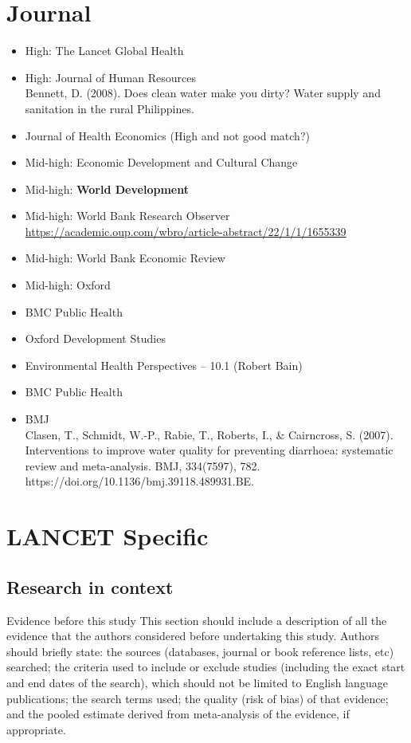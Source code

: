 \documentclass [11pt]{article}
\theoremstyle{plain}
\theoremstyle{definition}
\theoremstyle{remark}
\newcommand{\1}{\bm{1}}
\begin{document}
\section*{Journal} 
\begin{itemize}
	\item High: The Lancet Global Health
	\item High: Journal of Human Resources\\
	Bennett, D. (2008). Does clean water make you dirty? Water supply and sanitation in the rural Philippines.
	\item Journal of Health Economics (High and not good match?)
	\item Mid-high: Economic Development and Cultural Change
	\item Mid-high: \textbf{World Development}
	\item Mid-high: World Bank Research Observer\\
	\url{https://academic.oup.com/wbro/article-abstract/22/1/1/1655339}
	\item Mid-high: World Bank Economic Review
	\item Mid-high: Oxford
	\item	BMC Public Health
	\item Oxford Development Studies
	\item Environmental Health Perspectives – 10.1 (Robert Bain)
	\item BMC Public Health
	\item BMJ\\
Clasen, T., Schmidt, W.-P., Rabie, T., Roberts, I., \& Cairncross, S. (2007). Interventions to improve water quality for preventing diarrhoea: systematic review and meta-analysis. BMJ, 334(7597), 782. https://doi.org/10.1136/bmj.39118.489931.BE.
\end{itemize}

\iffalse
\clearpage
\section*{LANCET Specific}  
\subsection{Research in context}  
Evidence before this study This section should include a description of all the evidence that the authors considered before undertaking this study. Authors should briefly state: the sources (databases, journal or
book reference lists, etc) searched; the criteria used to include or exclude studies (including the exact start and end dates of the search), which should not be limited to English language publications; the search terms used; the quality (risk of bias) of that evidence; and the pooled estimate derived from meta-analysis of the evidence, if appropriate.
\end{document}
